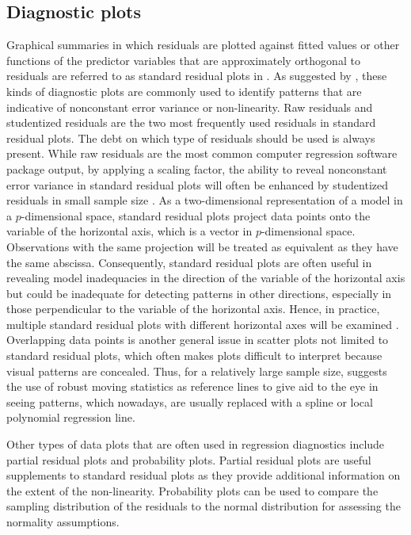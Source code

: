 \documentclass[]{interact}
\theoremstyle{plain}%
\theoremstyle{definition}
\theoremstyle{remark}
\begin{document}
\hypertarget{diagnostic-plots}{%
\subsection{Diagnostic plots}\label{diagnostic-plots}}

Graphical summaries in which residuals are plotted against fitted values
or other functions of the predictor variables that are approximately
orthogonal to residuals are referred to as standard residual plots in
\citet{cook1982residuals}. As suggested by \citet{cook1982residuals},
these kinds of diagnostic plots are commonly used to identify patterns
that are indicative of nonconstant error variance or non-linearity. Raw
residuals and studentized residuals are the two most frequently used
residuals in standard residual plots. The debt on which type of
residuals should be used is always present. While raw residuals are the
most common computer regression software package output, by applying a
scaling factor, the ability to reveal nonconstant error variance in
standard residual plots will often be enhanced by studentized residuals
in small sample size \citep{gunst1980regression}. As a two-dimensional
representation of a model in a \(p\)-dimensional space, standard
residual plots project data points onto the variable of the horizontal
axis, which is a vector in \(p\)-dimensional space. Observations with
the same projection will be treated as equivalent as they have the same
abscissa. Consequently, standard residual plots are often useful in
revealing model inadequacies in the direction of the variable of the
horizontal axis but could be inadequate for detecting patterns in other
directions, especially in those perpendicular to the variable of the
horizontal axis. Hence, in practice, multiple standard residual plots
with different horizontal axes will be examined
\citep{cook1982residuals}. Overlapping data points is another general
issue in scatter plots not limited to standard residual plots, which
often makes plots difficult to interpret because visual patterns are
concealed. Thus, for a relatively large sample size,
\citet{cleveland1975graphical} suggests the use of robust moving
statistics as reference lines to give aid to the eye in seeing patterns,
which nowadays, are usually replaced with a spline or local polynomial
regression line.

Other types of data plots that are often used in regression diagnostics
include partial residual plots and probability plots. Partial residual
plots are useful supplements to standard residual plots as they provide
additional information on the extent of the non-linearity. Probability
plots can be used to compare the sampling distribution of the residuals
to the normal distribution for assessing the normality assumptions.
\end{document}
